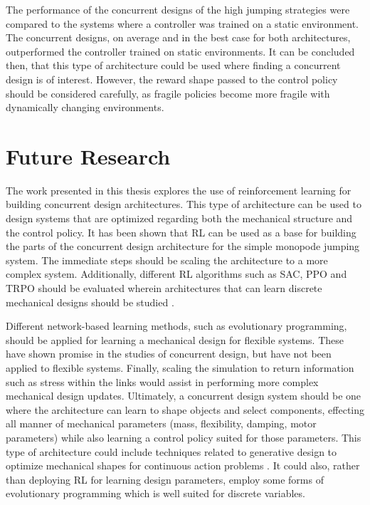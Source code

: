  The performance of the concurrent designs of the high jumping strategies were compared to the systems where a controller was trained on a static environment. The concurrent designs, on average and in the best case for both architectures, outperformed the controller trained on static environments. It can be concluded then, that this type of architecture could be used where finding a concurrent design is of interest. However, the reward shape passed to the control policy should be considered carefully, as fragile policies become more fragile with dynamically changing environments.  

\section{Future Research}

The work presented in this thesis explores the use of reinforcement learning for building concurrent design architectures. This type of architecture can be used to design systems that are optimized regarding both the mechanical structure and the control policy. It has been shown that RL can be used as a base for building the parts of the concurrent design architecture for the simple monopode jumping system. The immediate steps should be scaling the architecture to a more complex system. Additionally, different RL algorithms such as SAC, PPO and TRPO should be evaluated wherein architectures that can learn discrete mechanical designs should be studied \cite{Schulman2017f,Haarnoja2018, Schulman2015c}. 

Different network-based learning methods, such as evolutionary programming, should be applied for learning a mechanical design for flexible systems. These have shown promise in the studies of concurrent design, but have not been applied to flexible systems. Finally, scaling the simulation to return information such as stress within the links would assist in performing more complex mechanical design updates. Ultimately, a concurrent design system should be one where the architecture can learn to shape objects and select components, effecting all manner of mechanical parameters (mass, flexibility, damping, motor parameters) while also learning a control policy suited for those parameters. This type of architecture could include techniques related to generative design to optimize mechanical shapes for continuous action problems \cite{briard:hal-02948764, doi:10.1504/IJDE.2017.085639}. It could also, rather than deploying RL for learning design parameters, employ some forms of evolutionary programming which is well suited for discrete variables. 